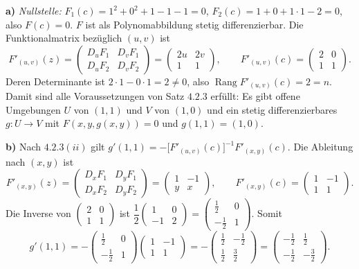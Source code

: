 \documentclass[a4paper,11pt]{article}
\begin{document}
\textbf{a)} \textit{Nullstelle:} $F_1(c)=1^2+0^2+1-1-1=0$, $F_2(c)=1+0+1\cdot1-2=0$, also $F(c)=0$. $F$ ist als Polynomabbildung stetig differenzierbar. Die Funktionalmatrix bezüglich $(u,v)$ ist
\[ F'_{(u,v)}(z)=\begin{pmatrix} D_uF_1 & D_vF_1\\ D_uF_2 & D_vF_2\end{pmatrix}=\begin{pmatrix} 2u & 2v\\ 1 & 1\end{pmatrix},\qquad F'_{(u,v)}(c)=\begin{pmatrix} 2 & 0\\ 1 & 1\end{pmatrix}. \]
Deren Determinante ist $2\cdot1-0\cdot1=2\neq 0$, also $\operatorname{Rang}F'_{(u,v)}(c)=2=n$. Damit sind alle Voraussetzungen von Satz $4.2.3$ erfüllt: Es gibt offene Umgebungen $U$ von $(1,1)$ und $V$ von $(1,0)$ und ein stetig differenzierbares $g:U\to V$ mit $F(x,y,g(x,y))=0$ und $g(1,1)=(1,0)$.

\textbf{b)} Nach $4.2.3(ii)$ gilt $g'(1,1)=-\bigl[F'_{(u,v)}(c)\bigr]^{-1}F'_{(x,y)}(c)$. Die Ableitung nach $(x,y)$ ist
\[ F'_{(x,y)}(z)=\begin{pmatrix} D_xF_1 & D_yF_1\\ D_xF_2 & D_yF_2\end{pmatrix}=\begin{pmatrix} 1 & -1\\ y & x\end{pmatrix},\qquad F'_{(x,y)}(c)=\begin{pmatrix} 1 & -1\\ 1 & 1\end{pmatrix}. \]
Die Inverse von $\begin{pmatrix}2&0\\1&1\end{pmatrix}$ ist $\dfrac{1}{2}\begin{pmatrix}1&0\\-1&2\end{pmatrix}=\begin{pmatrix}\tfrac12&0\\[2pt]-\tfrac12&1\end{pmatrix}$. Somit
\[ g'(1,1)=-\begin{pmatrix}\tfrac12&0\\[2pt]-\tfrac12&1\end{pmatrix}\begin{pmatrix}1&-1\\1&1\end{pmatrix} = -\begin{pmatrix}\tfrac12&-\tfrac12\\[2pt]\tfrac12&\tfrac32\end{pmatrix} = \begin{pmatrix}-\tfrac12&\tfrac12\\[2pt]-\tfrac12&-\tfrac32\end{pmatrix}. \]
\end{document}
